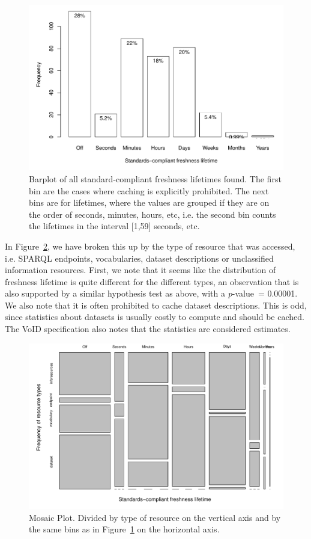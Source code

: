 \documentclass{llncs}
\newcommand{\pvalue}{\textit{p}-value\ }
\begin{document}
\begin{figure}[ht]
  \centerline{%
    \includegraphics[width=.9\textwidth]{hardall.pdf}}
  \caption{Barplot of all standard-compliant freshness lifetimes
    found. The first bin are the cases where caching is explicitly
    prohibited. The next bins are for lifetimes, where the values are
    grouped if they are on the order of seconds, minutes, hours, etc,
    i.e. the second bin counts the lifetimes in the interval [1,59]
    seconds, etc.}
  \label{fig:hardall}
\end{figure}



In Figure~\ref{fig:hardtable}, we have broken this
up by the type of resource that was accessed, i.e. SPARQL endpoints,
vocabularies, dataset descriptions or unclassified information
resources. First, we note that it seems like the distribution of
freshness lifetime is quite different for the different types, an
observation that is also supported by a similar hypothesis test as
above, with a \pvalue = 0.00001. We also note that it is often
prohibited to cache dataset descriptions. This is odd, since
statistics about datasets is usually costly to compute and should be
cached. The VoID specification \cite{voidnote} also notes that the
statistics are considered estimates.

\begin{figure}[ht]
  \centerline{%
    \includegraphics[width=.9\textwidth]{hardtable.pdf}}
  \caption{Mosaic Plot. Divided by type of resource on the vertical
    axis and by the same bins as in Figure~\ref{fig:hardall} on the
    horizontal axis. }
  \label{fig:hardtable}
\end{figure}
\end{document}
